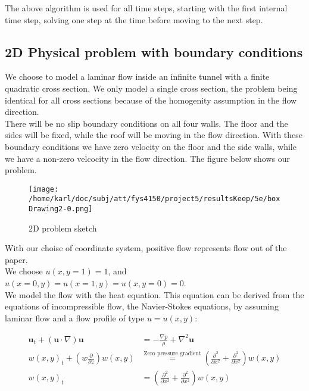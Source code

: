 \documentclass{article}
\begin{document}
The above algorithm is used for all time steps, starting with the first internal time step, solving one step at the time before moving to the next step.

\subsection{2D Physical problem with boundary conditions}
We choose to model a laminar flow inside an infinite tunnel with a finite quadratic cross section. We only model a single cross section, the problem being identical for all cross sections because of the homogenity assumption in the flow direction. \\

There will be no slip boundary conditions on all four walls. The floor and the sides will be fixed, while the roof will be moving in the flow direction. With these boundary conditions we have zero velocity on the floor and the side walls, while we have a non-zero velcocity in the flow direction. The figure below shows our problem.

\begin{figure}[H]
	\centering
	\texttt{[image: /home/karl/doc/subj/att/fys4150/project5/resultsKeep/5e/boxDrawing2-0.png]}
	\caption{2D problem sketch}
	\label{1}
\end{figure}

With our choise of coordinate system, positive flow represents flow out of the paper. \\

We choose $u(x,y=1) = 1$, and $u(x=0, y) = u(x=1,y) = u(x,y=0) = 0$. \\

We model the flow with the heat equation. This equation can be derived from the equations of incompressible flow, the Navier-Stokes equations, by assuming laminar flow and a flow profile of type $u = u(x,y)$:

\begin{subequations}
	\begin{align}
		\mathbf{u}_t + (\mathbf{u} \cdot \nabla) \mathbf{u} &= -\frac{\nabla p}{\rho} + \nabla^2 \mathbf{u}\\
		w(x,y)_t + (w \frac{\partial}{\partial z}) w(x,y) &\stackrel{\text{Zero pressure gradient}}{=} (\frac{\partial^2}{\partial x^2} + \frac{\partial^2}{\partial x^2} ) w(x,y)\\
		w(x,y)_t &= (\frac{\partial^2}{\partial x^2} + \frac{\partial^2}{\partial x^2} )w(x,y)\label{eq:ns}
	\end{align}
\end{subequations}
\end{document}
